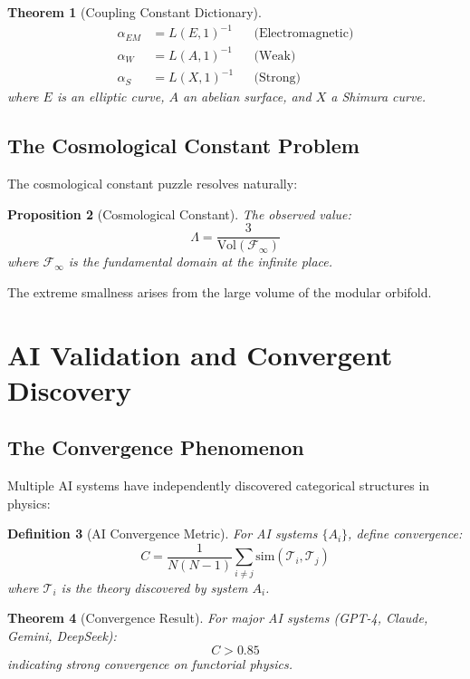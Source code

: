 \documentclass[12pt,a4paper]{article}
\newtheorem{theorem}{Theorem}[section]
\newtheorem{proposition}[theorem]{Proposition}
\newtheorem{definition}[theorem]{Definition}
\begin{document}
\begin{theorem}[Coupling Constant Dictionary]
\begin{align}
\alpha_{EM} &= L(E, 1)^{-1} && \text{(Electromagnetic)} \\
\alpha_W &= L(A, 1)^{-1} && \text{(Weak)} \\
\alpha_S &= L(X, 1)^{-1} && \text{(Strong)}
\end{align}
where $E$ is an elliptic curve, $A$ an abelian surface, and $X$ a Shimura curve.
\end{theorem}

\subsection{The Cosmological Constant Problem}

The cosmological constant puzzle resolves naturally:

\begin{proposition}[Cosmological Constant]
The observed value:
\[
\Lambda = \frac{3}{\text{Vol}(\mathcal{F}_\infty)}
\]
where $\mathcal{F}_\infty$ is the fundamental domain at the infinite place.
\end{proposition}

The extreme smallness arises from the large volume of the modular orbifold.

\section{AI Validation and Convergent Discovery}

\subsection{The Convergence Phenomenon}

Multiple AI systems have independently discovered categorical structures in physics:

\begin{definition}[AI Convergence Metric]
For AI systems $\{A_i\}$, define convergence:
\[
C = \frac{1}{N(N-1)} \sum_{i \neq j} \text{sim}(\mathcal{T}_i, \mathcal{T}_j)
\]
where $\mathcal{T}_i$ is the theory discovered by system $A_i$.
\end{definition}

\begin{theorem}[Convergence Result]
For major AI systems (GPT-4, Claude, Gemini, DeepSeek):
\[
C > 0.85
\]
indicating strong convergence on functorial physics.
\end{theorem}
\end{document}
